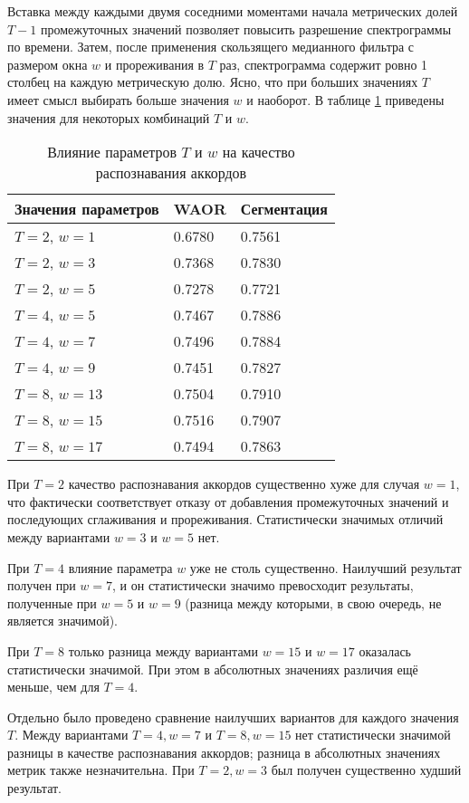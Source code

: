 Вставка между каждыми двумя соседними моментами начала метрических долей
$T-1$ промежуточных значений позволяет повысить разрешение спектрограммы по
времени. Затем, после применения скользящего медианного фильтра с размером окна
$w$ и прореживания в $T$ раз, спектрограмма содержит ровно 1 столбец на каждую
метрическую долю. Ясно, что при больших значениях $T$ имеет смысл выбирать
больше значения $w$ и наоборот. В таблице \ref{TTw} приведены значения для
некоторых комбинаций $T$ и $w$.

\begin{table} [htbp]
  \centering
  \parbox{15cm}{\caption{Влияние параметров $T$ и $w$ на качество распознавания
  аккордов} \label{TTw}}
  \begin{tabular}{|l|l|l|}
  \hline
  Значения параметров & WAOR & Сегментация \\
  \hline
  $T = 2$, $w = 1$ & 0.6780 & 0.7561 \\
  $T = 2$, $w = 3$ & 0.7368 & 0.7830 \\
  $T = 2$, $w = 5$ & 0.7278 & 0.7721 \\
  \hline
  $T = 4$, $w = 5$ & 0.7467 & 0.7886 \\
  $T = 4$, $w = 7$ & 0.7496 & 0.7884 \\
  $T = 4$, $w = 9$ & 0.7451 & 0.7827 \\
  \hline
  $T = 8$, $w = 13$ & 0.7504 & 0.7910 \\
  $T = 8$, $w = 15$ & 0.7516 & 0.7907 \\
  $T = 8$, $w = 17$ & 0.7494 & 0.7863 \\
  \hline
  \end{tabular}
\end{table}

При $T=2$ качество распознавания аккордов существенно хуже для случая $w=1$, что
фактически соответствует отказу от добавления промежуточных значений и
последующих сглаживания и прореживания. Статистически значимых отличий между
вариантами $w=3$ и $w=5$ нет.

При $T=4$ влияние параметра $w$ уже не столь существенно. Наилучший результат
получен при $w=7$, и он статистически значимо превосходит результаты, полученные
при $w=5$ и $w=9$ (разница между которыми, в свою очередь, не является
значимой).

При $T=8$ только разница между вариантами $w=15$ и $w=17$ оказалась
статистически значимой. При этом в абсолютных значениях различия ещё меньше, чем
для $T=4$.

Отдельно было проведено сравнение наилучших вариантов для каждого значения $T$.
Между вариантами $T=4, w=7$ и $T=8, w=15$ нет статистически значимой разницы в
качестве распознавания аккордов; разница в абсолютных значениях метрик также
незначительна. При $T=2, w=3$ был получен существенно худший результат.

